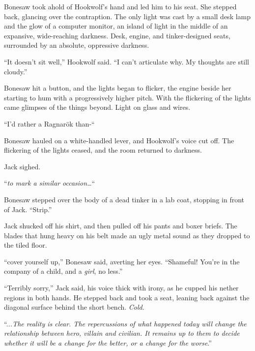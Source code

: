 Bonesaw took ahold of Hookwolf's hand and led him to his seat.  She stepped back, glancing over the contraption.  The only light was cast by a small desk lamp and the glow of a computer monitor, an island of light in the middle of an expansive, wide-reaching darkness.  Desk, engine, and tinker-designed seats, surrounded by an absolute, oppressive darkness.



``It doesn't sit well,'' Hookwolf said.  ``I can't articulate why.  My thoughts are still cloudy.''



Bonesaw hit a button, and the lights began to flicker, the engine beside her starting to hum with a progressively higher pitch.  With the flickering of the lights came glimpses of the things beyond.  Light on glass and wires.



``I'd rather a Ragnar\"{o}k than-``



Bonesaw hauled on a white-handled lever, and Hookwolf's voice cut off.  The flickering of the lights ceased, and the room returned to darkness.



Jack sighed.



``\emph{\ldotsthreatens to mark a similar occasion\ldots}``



Bonesaw stepped over the body of a dead tinker in a lab coat, stopping in front of Jack.  ``Strip.''



Jack shucked off his shirt, and then pulled off his pants and boxer briefs.  The blades that hung heavy on his belt made an ugly metal sound as they dropped to the tiled floor.



``\ldotsand cover yourself up,'' Bonesaw said, averting her eyes.  ``Shameful!  You're in the company of a child, and a \emph{girl}, no less.''



``Terribly sorry,'' Jack said, his voice thick with irony, as he cupped his nether regions in both hands.  He stepped back and took a seat, leaning back against the diagonal surface behind the short bench.  \emph{Cold}.



``.\emph{..The reality is clear.  The repercussions of what happened today will change the relationship between hero, villain and civilian.  It remains up to them to decide whether it will be a change for the better, or a change for the worse}.''



